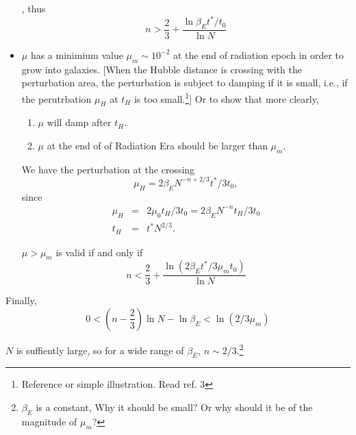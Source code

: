 \documentclass{article}
\begin{document}
\begin{itemize}
{%
}, thus 
\begin{equation}
n>\frac{2}{3}+\frac{\ln{\beta_E t^*/t_0}}{\ln{N}}
\end{equation}




\vspace{2em}
\item $\mu$ has a minimium value $\mu_m\sim  10^{-2}$ at the end of radiation epoch in order to grow into galaxies.
[When the Hubble distance is crossing with the perturbation area, the perturbation is subject to damping if it is small, i.e., if the perutrbation $\mu_H$ at $t_H$ is too small.\footnote{Reference or simple illustration. Read ref. 3}] Or to show that more clearly, 
\begin{enumerate}
\item 
$\mu$ will damp after $t_H$.
\item
$\mu$ at the end of of Radiation Era should be larger than $\mu_m$.
\end{enumerate}

\vspace{2em}
We have the perturbation at the crossing
\begin{equation}\mu_H=2\beta_E N^{-n+2/3}t^*/3t_0,
\end{equation}
since
\begin{eqnarray*}
\mu_H&=&2\mu_0 t_H/3t_0=2\beta_E N^{-n} t_H/3t_0    \\
t_H&=&t^* N^{2/3}.
\end{eqnarray*}


$\mu>\mu_m$ is valid if and only if
\begin{equation}
n<\frac 2 3+\frac{\ln{(2\beta_E t^*/3\mu_m t_0)}}{\ln N}
\end{equation}

\end{itemize}

\vspace{2em}

Finally, 
\begin{equation}
0<(n-\frac{2}{3})\ln N-\ln \beta_E<\ln{(2/3\mu_m)}
\end{equation}

$N$ is suffiently large, so for a wide range of $\beta_E$, $n\sim 2/3$.\footnote{
$\beta_E$ is a constant, Why it should be small? Or why should it be of the magnitude of $\mu_m$?
}
\end{document}
